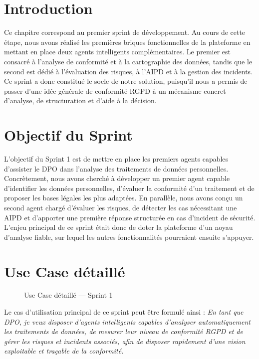 \documentclass[12pt,a4paper]{report}
\begin{document}
\section{Introduction}

Ce chapitre correspond au premier sprint de développement. Au cours de cette étape, nous avons réalisé les premières briques fonctionnelles de la plateforme en mettant en place deux agents intelligents complémentaires. Le premier est consacré à l'analyse de conformité et à la cartographie des données, tandis que le second est dédié à l'évaluation des risques, à l'AIPD et à la gestion des incidents. Ce sprint a donc constitué le socle de notre solution, puisqu'il nous a permis de passer d'une idée générale de conformité RGPD à un mécanisme concret d'analyse, de structuration et d'aide à la décision.

\section{Objectif du Sprint}

L'objectif du Sprint 1 est de mettre en place les premiers agents capables d'assister le DPO dans l'analyse des traitements de données personnelles. Concrètement, nous avons cherché à développer un premier agent capable d'identifier les données personnelles, d'évaluer la conformité d'un traitement et de proposer les bases légales les plus adaptées. En parallèle, nous avons conçu un second agent chargé d'évaluer les risques, de détecter les cas nécessitant une AIPD et d'apporter une première réponse structurée en cas d'incident de sécurité. L'enjeu principal de ce sprint était donc de doter la plateforme d'un noyau d'analyse fiable, sur lequel les autres fonctionnalités pourraient ensuite s'appuyer.

\section{Use Case détaillé}

\begin{figure}[H]
\centering
{}
\caption{Use Case détaillé --- Sprint 1}
\label{fig:use_case_sprint1}
\end{figure}

Le cas d'utilisation principal de ce sprint peut être formulé ainsi : \textit{En tant que DPO, je veux disposer d'agents intelligents capables d'analyser automatiquement les traitements de données, de mesurer leur niveau de conformité RGPD et de gérer les risques et incidents associés, afin de disposer rapidement d'une vision exploitable et traçable de la conformité.}
\end{document}
